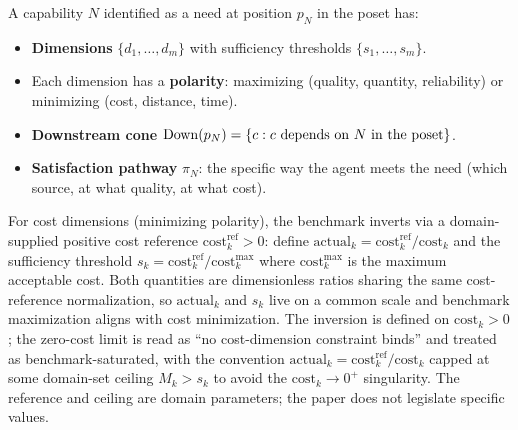\begin{definition}
\label{def:need_bundle}
A capability $N$ identified as a need at position $p_N$ in the
poset has:
\begin{itemize}
\item \textbf{Dimensions} $\{d_1, \ldots, d_m\}$ with sufficiency
  thresholds $\{s_1, \ldots, s_m\}$.
\item Each dimension has a \textbf{polarity}: maximizing (quality,
  quantity, reliability) or minimizing (cost, distance, time).
\item \textbf{Downstream cone}
  $\mathrm{Down}(p_N) = \{c : c \text{ depends on } N \text{ in the
  poset}\}$.
\item \textbf{Satisfaction pathway} $\pi_N$: the specific way the
  agent meets the need (which source, at what quality, at what
  cost).
\end{itemize}
For cost dimensions (minimizing polarity), the benchmark
inverts via a domain-supplied positive cost reference
$\mathrm{cost}_k^{\mathrm{ref}} > 0$: define
$\mathrm{actual}_k = \mathrm{cost}_k^{\mathrm{ref}} /
\mathrm{cost}_k$ and the sufficiency threshold
$s_k = \mathrm{cost}_k^{\mathrm{ref}} /
\mathrm{cost}_k^{\mathrm{max}}$ where
$\mathrm{cost}_k^{\mathrm{max}}$ is the maximum acceptable
cost.  Both quantities are dimensionless ratios sharing the same
cost-reference normalization, so $\mathrm{actual}_k$ and $s_k$
live on a common scale and benchmark maximization aligns with
cost minimization.  The inversion is defined on
$\mathrm{cost}_k > 0$; the zero-cost limit is read as ``no
cost-dimension constraint binds'' and treated as
benchmark-saturated, with the convention $\mathrm{actual}_k =
\mathrm{cost}_k^{\mathrm{ref}} / \mathrm{cost}_k$ capped at
some domain-set ceiling $M_k > s_k$ to avoid the $\mathrm{cost}_k
\to 0^+$ singularity.  The reference and ceiling are domain
parameters; the paper does not legislate specific values.
\end{definition}

